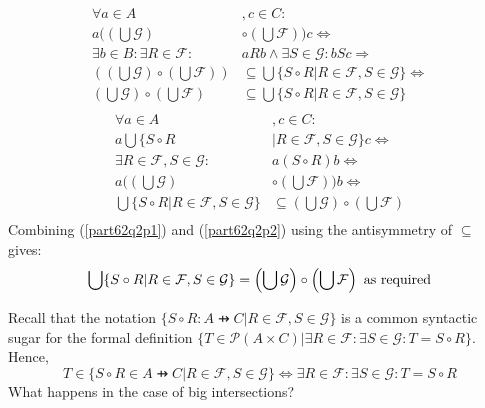 \documentclass[10pt,\jkfside,a4paper]{article}
\begin{document}
\begin{enumerate}
\begin{equation}\label{part62q2p1}
\begin{split}
\forall a \in A&, c \in C: \\
a (\left(\bigcup \mathcal{G} \right) &\circ \left(\bigcup \mathcal{F} \right))c \Longleftrightarrow \\
\exists b \in B: \exists R \in \mathcal{F}:& a R b \wedge \exists S \in \mathcal{G}: b S c \Longrightarrow \\
\left(\left(\bigcup \mathcal{G}\right) \circ \left(\bigcup \mathcal{F}\right)\right) &\subseteq \bigcup\{S \circ R | R \in \mathcal{F}, S \in \mathcal{G}\} \Longleftrightarrow \\
\left(\bigcup \mathcal{G}\right) \circ \left(\bigcup \mathcal{F}\right) &\subseteq \bigcup\{S \circ R | R \in \mathcal{F}, S \in \mathcal{G}\} \\
\end{split}
\end{equation}
\begin{equation}\label{part62q2p2}
\begin{split}
\forall a \in A&, c \in C: \\
a \bigcup\{S \circ R &| R \in \mathcal{F}, S \in \mathcal{G}\} c \Longleftrightarrow \\
\exists R \in \mathcal{F}, S \in \mathcal{G}:& a (S \circ R) b \Longleftrightarrow \\
a (\left(\bigcup \mathcal{G}\right) &\circ \left(\bigcup \mathcal{F}\right) ) b \Longleftrightarrow \\
\bigcup \{ S \circ R | R \in \mathcal{F}, S \in \mathcal{G}\} &\subseteq \left (\bigcup \mathcal{G} \right ) \circ \left ( \bigcup \mathcal{F} \right ) \\
\end{split}
\end{equation}
Combining (\ref{part62q2p1}) and (\ref{part62q2p2}) using the antisymmetry of $\subseteq$ gives:
\begin{equation}
\bigcup\{S \circ R | R \in \mathcal{F}, S \in \mathcal{G}\} = \left(\bigcup \mathcal{G}\right) \circ \left(\bigcup \mathcal{F}\right) \text{ as required}\\
\end{equation}

Recall that the notation $\{ S \circ R: A \pfun C | R \in \mathcal{F}, S \in \mathcal{G}\}$ is a common syntactic sugar 
for the formal definition $\{T \in \mathcal{P}(A \times C)| \exists R \in \mathcal{F}: \exists S \in \mathcal{G}: T = S \circ R\}$. Hence,
\begin{equation}
T \in \{S \circ R \in A \pfun C | R \in \mathcal{F}, S \in \mathcal{G}\} \Longleftrightarrow \exists R \in \mathcal{F}: \exists S \in \mathcal{G}: T = S \circ R
\end{equation}
What happens in the case of big intersections?




\end{enumerate}
\end{document}
